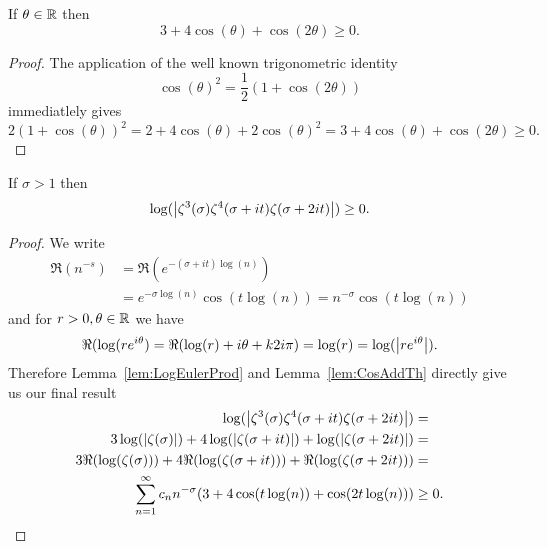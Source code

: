 \begin{lemma}\label{lem:CosAddTh}
	If $\theta \in \mathbb{R}$ then
\begin{equation*}
	3 + 4 \cos(\theta) + \cos(2 \theta) \geq 0.
\end{equation*}
\end{lemma}
\begin{proof}
	The application of the well known trigonometric identity
\begin{equation*}
	\cos(\theta)^2 = \frac{1}{2}(1 + \cos(2 \theta))
\end{equation*}
	immediatlely gives
\begin{equation*}
	2(1 + \cos(\theta))^2 = 2 + 4 \cos(\theta) + 2 \cos(\theta)^2 = 3 + 4 \cos(\theta) + \cos(2 \theta) \geq 0.
\end{equation*}
\end{proof}


\begin{corollary}\label{cor:LogZeta}
	If $\sigma > 1$ then
\begin{equation*}
	\log(\left|\zeta^3(\sigma) \zeta^4(\sigma + it) \zeta(\sigma + 2it)\right|) \geq 0.
\end{equation*}
\end{corollary}
\begin{proof}
	We write
\begin{equation*}
\begin{aligned}	
	\Re(n^{-s}) 
		&= \Re(e^{-(\sigma + it) \log(n)}) \\
		&= e^{-\sigma \log(n)} \cos(t \log(n)) 
		= n^{-\sigma} \cos(t \log(n))
\end{aligned}
\end{equation*}
	and for $r > 0, \theta \in \mathbb{R}$ we have
\begin{equation*}
	\Re(\log(r e^{i \theta}) = \Re(\log(r) + i\theta + k2i\pi) = \log(r) = \log(\left|r e^{i\theta}\right|).
\end{equation*}
	Therefore Lemma~\ref{lem:LogEulerProd} and Lemma~\ref{lem:CosAddTh} directly give us our final result
\begin{equation*}
\begin{aligned}
	\log(\left|\zeta^3(\sigma) \zeta^4(\sigma + it) \zeta(\sigma + 2it)\right|) &= \\
	3\log(\left|\zeta(\sigma)\right|) + 4\log(\left|\zeta(\sigma + it)\right|) + \log(\left|\zeta(\sigma + 2it)\right|) &= \\
	3\Re(\log(\zeta(\sigma))) + 4\Re(\log(\zeta(\sigma + it))) + \Re(\log(\zeta(\sigma + 2it))) &= \\
	\sum _{n=1} ^{\infty} c_n n^{-\sigma}(3 + 4\cos(t \log(n)) + \cos(2 t \log(n))) &\geq 0.
\end{aligned}
\end{equation*}
\end{proof}


